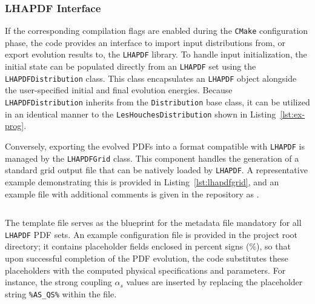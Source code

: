 \documentclass[preprint,12pt]{elsarticle}
\begin{document}
\begin{listing}
  \inputminted[frame=lines,linenos]{cpp}{res/dglap_options.cpp}
  \caption{The \texttt{DGLAPOptions} struct, containing options related to the evolution.}
  \label{lst:dglap-options}
\end{listing}



\subsubsection{LHAPDF Interface}
\label{subsec:lhapdf-interface}

If the corresponding compilation flags are enabled during the \texttt{CMake} 
configuration phase, the code provides an interface to import input 
distributions from, or export evolution results to, the \texttt{LHAPDF} library. 
To handle input initialization, the initial state can be populated directly from 
an \texttt{LHAPDF} set using the \texttt{LHAPDFDistribution} class. This 
class encapsulates an \texttt{LHAPDF} object alongside the user-specified initial 
and final evolution energies. Because \texttt{LHAPDFDistribution} inherits 
from the \texttt{Distribution} base class, it can be utilized in an 
identical manner to the \texttt{LesHouchesDistribution} shown in 
Listing~\ref{lst:ex-prog}.

Conversely, exporting the evolved PDFs into a format 
compatible with \texttt{LHAPDF} is managed by the 
\texttt{LHAPDFGrid} class. This component handles the generation of a standard 
grid output file that can be natively loaded by \texttt{LHAPDF}. A representative 
example demonstrating this is provided in Listing~\ref{lst:lhapdfgrid}, and an example file with additional comments is given in the repository as .

\begin{listing}
  \inputminted[frame=lines,linenos]{cpp}{res/lhapdfgrid.cpp}
  \caption{An example program that will create an LHAPDF-formatted grid called ``testpdf''.}
  \label{lst:lhapdfgrid}
\end{listing}

The template file  serves as the blueprint for the  metadata file mandatory for all \texttt{LHAPDF} PDF sets. An example configuration file is provided in the project root directory; it contains placeholder fields enclosed in percent signs (\%), so that upon successful completion of the PDF evolution, the code substitutes these placeholders with the computed physical specifications and parameters. For instance, the strong coupling $\alpha_s$ values are inserted by replacing the placeholder string \texttt{\%AS\_QS\%} within the file.
\end{document}
